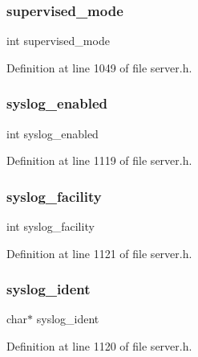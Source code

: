 \subsubsection{\texorpdfstring{supervised\+\_\+mode}{supervised\_mode}}
{\footnotesize\ttfamily int supervised\+\_\+mode}



Definition at line 1049 of file server.\+h.

\mbox{\label{structredis_server_a1e234838fd4211781e47a97ca8dd03cc}} 
\subsubsection{\texorpdfstring{syslog\+\_\+enabled}{syslog\_enabled}}
{\footnotesize\ttfamily int syslog\+\_\+enabled}



Definition at line 1119 of file server.\+h.

\mbox{\label{structredis_server_a4f074cb73b7191ef570261fb35b29a8e}} 
\subsubsection{\texorpdfstring{syslog\+\_\+facility}{syslog\_facility}}
{\footnotesize\ttfamily int syslog\+\_\+facility}



Definition at line 1121 of file server.\+h.

\mbox{\label{structredis_server_ae4a6e447ef5fbc09a9765fa2da7c51d7}} 
\subsubsection{\texorpdfstring{syslog\+\_\+ident}{syslog\_ident}}
{\footnotesize\ttfamily char$\ast$ syslog\+\_\+ident}



Definition at line 1120 of file server.\+h.


